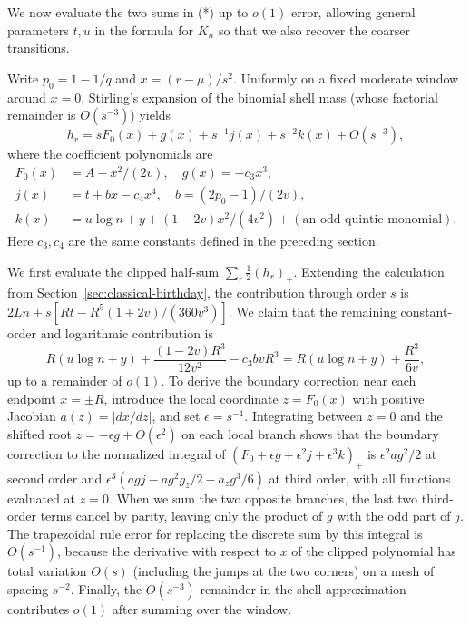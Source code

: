 We now evaluate the two sums in (*) up to \(o(1)\) error, allowing general parameters \(t,u\) in the formula for \(K_n\) so that we also recover the coarser transitions.

Write \(p_0=1-1/q\) and \(x=(r-\mu)/s^2\). Uniformly on a fixed moderate window around \(x=0\), Stirling's expansion of the binomial shell mass (whose factorial remainder is \(O(s^{-3})\)) yields
\[
 h_r=sF_0(x)+g(x)+s^{-1}j(x)+s^{-2}k(x)+O(s^{-3}),
\]
where the coefficient polynomials are
\[
 \begin{split}
 F_0(x)&=A-x^2/(2v),\quad g(x)=-c_3x^3,\\
 j(x)&=t+b x-c_4x^4,\quad b=(2p_0-1)/(2v),\\
 k(x)&=u\log n+y+(1-2v)x^2/(4v^2)
                      +(\text{an odd quintic monomial}).
 \end{split}
\]
Here \(c_3,c_4\) are the same constants defined in the preceding section.

We first evaluate the clipped half-sum \(\sum_r \tfrac12(h_r)_+\). Extending the calculation from Section~\ref{sec:classical-birthday}, the contribution through order \(s\) is \(2Ln+s[Rt-R^5(1+2v)/(360v^3)]\). We claim that the remaining constant-order and logarithmic contribution is
\[
 R(u\log n+y)+\frac{(1-2v)R^3}{12v^2}-c_3 b v R^3
   =R(u\log n+y)+\frac{R^3}{6v},
\]
up to a remainder of \(o(1)\). To derive the boundary correction near each endpoint \(x=\pm R\), introduce the local coordinate \(z=F_0(x)\) with positive Jacobian \(a(z)=|dx/dz|\), and set \(\epsilon=s^{-1}\). Integrating between \(z=0\) and the shifted root \(z=-\epsilon g+O(\epsilon^2)\) on each local branch shows that the boundary correction to the normalized integral of \((F_0+\epsilon g+\epsilon^2j+\epsilon^3k)_+\) is \(\epsilon^2 a g^2/2\) at second order and \(\epsilon^3(a g j-a g^2 g_z/2-a_z g^3/6)\) at third order, with all functions evaluated at \(z=0\). When we sum the two opposite branches, the last two third-order terms cancel by parity, leaving only the product of \(g\) with the odd part of \(j\). The trapezoidal rule error for replacing the discrete sum by this integral is \(O(s^{-1})\), because the derivative with respect to \(x\) of the clipped polynomial has total variation \(O(s)\) (including the jumps at the two corners) on a mesh of spacing \(s^{-2}\). Finally, the \(O(s^{-3})\) remainder in the shell approximation contributes \(o(1)\) after summing over the window.

